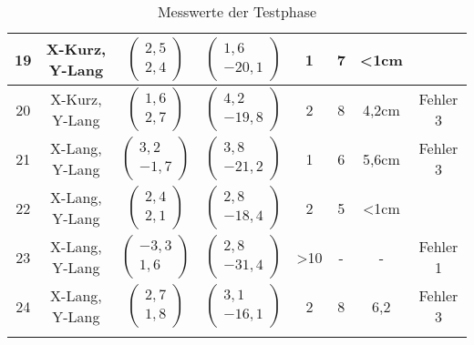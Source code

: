 \begin{center}
\begin{longtable}{|c|c|c|c|c|c|c|c|}
		\hline
		19 & X-Kurz, Y-Lang &  $\left(\begin{array}{c} 2,5 \\ 2,4\end{array}\right)$ & $\left(\begin{array}{c} 1,6 \\ -20,1\end{array}\right)$ & 1& 7& <1cm& \checkmark\\
		\hline
		20 & X-Kurz, Y-Lang &  $\left(\begin{array}{c} 1,6 \\ 2,7\end{array}\right)$ & $\left(\begin{array}{c} 4,2 \\ -19,8\end{array}\right)$ & 2& 8& 4,2cm& Fehler 3\\
		\hline
		21 & X-Lang, Y-Lang &  $\left(\begin{array}{c} 3,2 \\ -1,7\end{array}\right)$ & $\left(\begin{array}{c} 3,8 \\ -21,2\end{array}\right)$ & 1& 6& 5,6cm& Fehler 3\\
		\hline
		22 & X-Lang, Y-Lang &  $\left(\begin{array}{c} 2,4 \\ 2,1\end{array}\right)$ & $\left(\begin{array}{c} 2,8 \\ -18,4\end{array}\right)$ & 2& 5& <1cm& \checkmark\\
		\hline
		23 & X-Lang, Y-Lang &  $\left(\begin{array}{c} -3,3 \\ 1,6\end{array}\right)$ & $\left(\begin{array}{c} 2,8 \\ -31,4\end{array}\right)$ & >10& -& -& Fehler 1\\
		\hline
		24 & X-Lang, Y-Lang &  $\left(\begin{array}{c} 2,7 \\ 1,8\end{array}\right)$ & $\left(\begin{array}{c} 3,1 \\ -16,1\end{array}\right)$ & 2& 8& 6,2& Fehler 3\\
		\hline
	\caption{Messwerte der Testphase}
	\label{tab:messw}
	\end{longtable}
\end{center}

